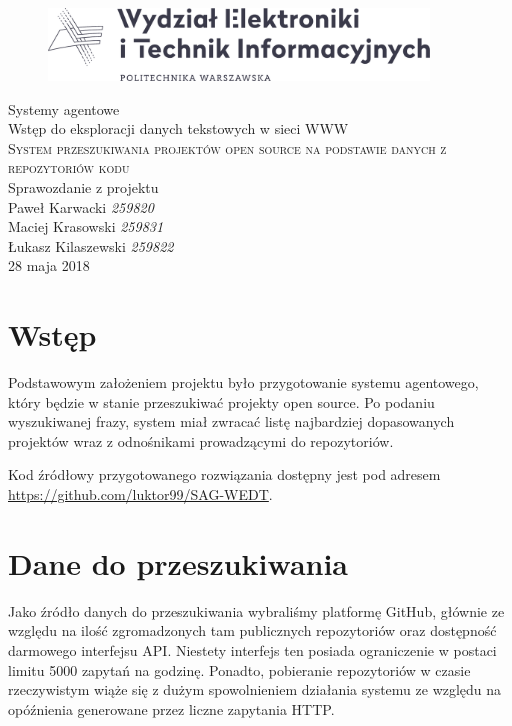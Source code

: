 \documentclass[12pt, oneside, final]{report}
\begin{document}
\begin{titlepage}
	\centering
	\begin{figure}
		\centering
		\includegraphics[width=0.9\textwidth]{logo.pdf}
	\end{figure}
	\vspace*{60pt}
	\Large{Systemy agentowe}\\
	\Large{Wstęp do eksploracji danych tekstowych w sieci WWW}\\
	\vspace{60pt}
	\textsc{\Huge{System przeszukiwania projektów open source na podstawie danych z repozytoriów kodu}}\\
	\vspace{20pt}
	\large{Sprawozdanie z projektu}\\
	\vspace{120pt}
	\Large{Paweł Karwacki \textit{259820}}\\
	\Large{Maciej Krasowski \textit{259831}}\\
	\Large{Łukasz Kilaszewski \textit{259822}}\\
	\vfill
	\large{28 maja 2018}
\end{titlepage}

\thispagestyle{empty}

\section*{Wstęp}
Podstawowym założeniem projektu było przygotowanie systemu agentowego, który będzie w stanie przeszukiwać projekty open source. Po podaniu wyszukiwanej frazy, system miał zwracać listę najbardziej dopasowanych projektów wraz z odnośnikami prowadzącymi do repozytoriów.

Kod źródłowy przygotowanego rozwiązania dostępny jest pod adresem \url{https://github.com/luktor99/SAG-WEDT}.

\section*{Dane do przeszukiwania}
Jako źródło danych do przeszukiwania wybraliśmy platformę GitHub, głównie ze względu na ilość zgromadzonych tam publicznych repozytoriów oraz dostępność darmowego interfejsu API. Niestety interfejs ten posiada ograniczenie w postaci limitu 5000 zapytań na godzinę. Ponadto, pobieranie repozytoriów w czasie rzeczywistym wiąże się z dużym spowolnieniem działania systemu ze względu na opóźnienia generowane przez liczne zapytania HTTP.
\end{document}
